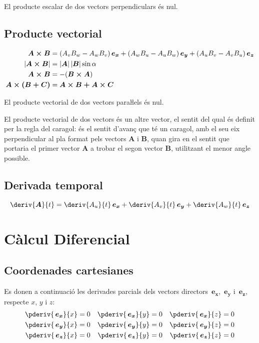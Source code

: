\documentclass[catalan,a4paper,twoside,11pt]{article}
\begin{document}
El producte escalar de dos vectors perpendiculars  és nul.

\subsection{Producte vectorial}

\begin{align}
    \boldsymbol{A\times B} &= (A_v B_w - A_w B_v)\va + (A_w B_u - A_u B_w)\vb +
    (A_u B_v - A_v B_u)\vc \\
    |\boldsymbol{A\times B}| &=|\boldsymbol{A}| \, |\boldsymbol{B}| \sin\alpha\\
    \boldsymbol{A\times B} &=-(\boldsymbol{B\times A})\\
    \boldsymbol{A\times(B+C)} &= \boldsymbol{A\times B+ A\times C}
\end{align}

El producte vectorial de dos vectors paraŀlels  és nul.

El producte vectorial de dos vectors és un altre vector, el
sentit del qual és definit per la regla del caragol: és el sentit
d'avanç que té un caragol, amb el seu eix perpendicular al
pla format pels vectors  $\boldsymbol{A}$ i $\boldsymbol{B}$, quan
gira en el sentit que portaria el primer vector  $\boldsymbol{A}$ a
trobar el segon vector $\boldsymbol{B}$, utilitzant el menor angle
possible.

\subsection{Derivada temporal}
\begin{equation}
    \deriv{\boldsymbol{A}}{t} = \deriv{A_u}{t}\va +
    \deriv{A_v}{t}\vb + \deriv{A_w}{t}\vc
\end{equation}


\section{Càlcul Diferencial }

\subsection{Coordenades cartesianes}
\renewcommand{\va}{\ensuremath{\,\boldsymbol{e_x}}}
\renewcommand{\vb}{\ensuremath{\,\boldsymbol{e_y}}}
\renewcommand{\vc}{\ensuremath{\,\boldsymbol{e_z}}}

Es donen a continuació les derivades parcials dels vectors directors $\va$, $\vb$ i $\vc$, respecte $x$, $y$ i $z$:
\begin{subequations}
\begin{align}
   \pderiv{\va}{x} &= 0 & \pderiv{\va}{y} &= 0 & \pderiv{\va}{z} &= 0 \\
   \pderiv{\vb}{x} &= 0 & \pderiv{\vb}{y} &= 0 & \pderiv{\vb}{z} &= 0 \\
   \pderiv{\vc}{x} &= 0 & \pderiv{\vc}{y} &= 0 & \pderiv{\vc}{z} &= 0
\end{align}
\end{subequations}
\end{document}

